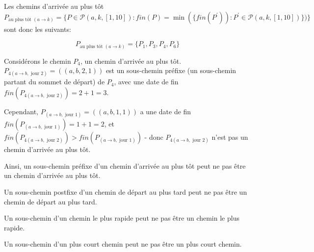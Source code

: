 \begin{reponse}
  Les chemins d'arrivée au plus tôt
  $$P_{\text{au plus tôt }(a \rightarrow k)} = \{P \in \mathcal{P}(a,k,[1,10]):
  fin(P) = \min(\{fin(P^{'})): P^{'} \in \mathcal{P}(a,k,[1,10])\})\}$$ sont
  donc les suivants:

  \begin{equation}
    \label{eq:3}
    P_{\text{au plus tôt }(a \rightarrow k)} = \{P_1, P_3, P_4, P_6\}
  \end{equation}

  Considérons le chemin $P_4$, un chemin d'arrivée au plus tôt.
  $P_{4 (a \rightarrow b, \text{ jour 2})} = ((a,b,2,1))$ est un sous-chemin
  préfixe (un sous-chemin partant du sommet de départ) de $P_4$, avec une date
  de fin $fin(P_{4 (a \rightarrow b, \text{ jour 2})}) = 2 + 1 = 3$.

  Cependant, $P_{(a \rightarrow b, \text{ jour 1})} = ((a,b,1,1))$ a une date de
  fin $fin(P_{(a \rightarrow b, \text{ jour 1})}) = 1 + 1 = 2$, et
  $fin(P_{4 (a \rightarrow b, \text{ jour 2})}) > fin(P_{(a \rightarrow b,
    \text{ jour 1})})$ - donc $P_{4 (a \rightarrow b, \text{ jour 2})}$
  n'est pas un chemin d'arrivée au plus tôt.

  Ainsi, un sous-chemin préfixe d'un chemin d'arrivée au plus tôt peut ne pas
  être un chemin d'arrivée au plus tôt.
\end{reponse}

\begin{assertion}
  Un sous-chemin postfixe d'un chemin de départ au plus tard peut ne pas être un
  chemin de départ au plus tard.
\end{assertion}

\begin{assertion}
  Un sous-chemin d'un chemin le plus rapide peut ne pas être un chemin le plus
  rapide.
\end{assertion}

\begin{assertion}
  Un sous-chemin d'un plus court chemin peut ne pas être un plus court chemin.
\end{assertion}

